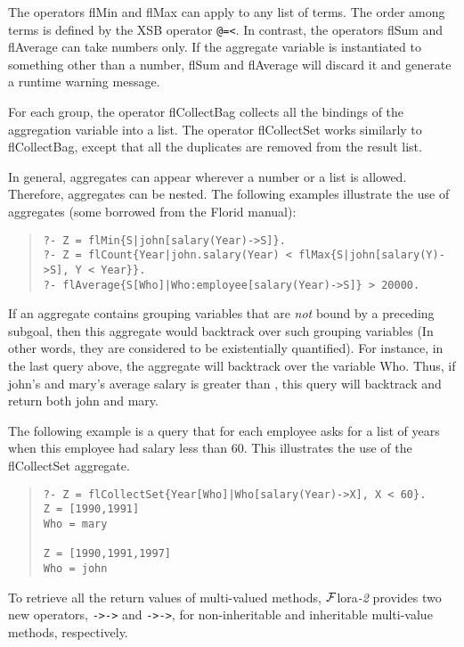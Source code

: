 \documentclass[11pt]{article}
\newcommand{\FLORA}{{\mbox{${\cal F}${\sc lora}\rm\emph{-2}}}\xspace}
\newcommand{\FLORID}{{\mbox{\sc Florid}}\xspace}
\begin{document}
The operators {\sf flMin} and {\sf flMax} can apply to any list of
terms. The order among terms is defined by the XSB operator {\tt @=<}.  In
contrast, the operators {\sf flSum} and {\sf flAverage} can take numbers only. If
the aggregate variable is instantiated to something other than a
number, {\sf flSum} and {\sf flAverage} will discard it and generate a runtime
warning message.

For each group, the operator {\sf flCollectBag} collects all the bindings of
the aggregation variable into a list. The operator {\sf flCollectSet} works
similarly to {\sf flCollectBag}, except that all the duplicates are removed
from the result list.

In general, aggregates can appear wherever a number or a list is
allowed. Therefore, aggregates can be nested. The following examples
illustrate the use of aggregates (some borrowed from the \FLORID manual):
\begin{quote}
\begin{verbatim}
?- Z = flMin{S|john[salary(Year)->S]}.
?- Z = flCount{Year|john.salary(Year) < flMax{S|john[salary(Y)->S], Y < Year}}.
?- flAverage{S[Who]|Who:employee[salary(Year)->S]} > 20000. 
\end{verbatim}
\end{quote}
If an aggregate contains grouping variables that are \emph{not} bound
by a preceding subgoal, then this aggregate would backtrack over such
grouping variables (In other words, they are considered to be
existentially quantified). For instance, in the last query above, the
aggregate will backtrack over the variable {\sf Who}. Thus, if
{\sf john}'s and {\sf mary}'s average salary is greater than {},
this query will backtrack and return both {\sf john} and {\sf mary}.

The following example is a query that for each employee asks for a list of
years when this employee had salary less than 60. This illustrates the use
of the {\sf flCollectSet} aggregate.
\begin{quote}
\begin{verbatim}
?- Z = flCollectSet{Year[Who]|Who[salary(Year)->X], X < 60}.
Z = [1990,1991]
Who = mary

Z = [1990,1991,1997]
Who = john
\end{verbatim}
\end{quote}

%
To retrieve all the return values of multi-valued methods, \FLORA provides
two new operators, {\tt ->->} and {\tt *->->}, for non-inheritable and
inheritable multi-value methods, respectively. 
\end{document}
